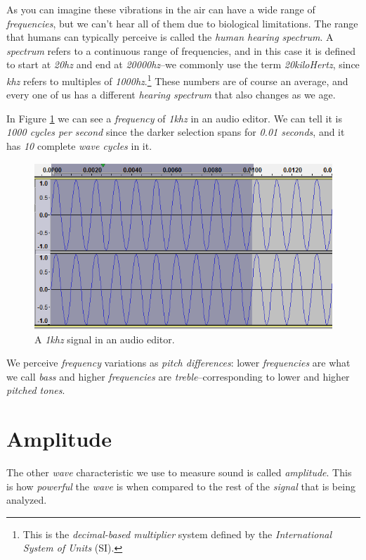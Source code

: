 \documentclass[10pt,a4paper]{report}
\newcommand{\ac}[1]{\textit{\acrshort{#1}}}
\newcommand{\hz}[1]{\textit{#1\acrshort{hz}}}
\newcommand{\khz}[1]{\textit{#1\acrshort{khz}}}
\begin{document}
As you can imagine these vibrations in the air can have a wide range of \textit{frequencies}, but we can't hear all of them due to biological limitations. The range that humans can typically perceive is called the \textit{human hearing spectrum}. A \textit{spectrum} refers to a continuous range of frequencies, and in this case it is defined to start at \hz{20} and end at \hz{20000}--we commonly use the term \textit{20kiloHertz}, since \ac{khz} refers to multiples of \hz{1000}.\footnote{This is the \textit{decimal-based multiplier} system defined by the \textit{International System of Units} (SI).} These numbers are of course an average, and every one of us has a different \textit{hearing spectrum} that also changes as we age.

In Figure \ref{fig:frequency} we can see a \textit{frequency} of \khz{1} in an audio editor. We can tell it is \textit{1000 cycles per second} since the darker selection spans for \textit{0.01 seconds}, and it has \textit{10} complete \textit{wave cycles} in it.

\begin{figure}[H]
	\centering
	\includegraphics[width=0.8\linewidth]{images/audio/frequency.png}
	\caption[Frequency]{A \khz{1} signal in an audio editor.}
	\label{fig:frequency}
\end{figure}

We perceive \textit{frequency} variations as \textit{pitch differences}: lower \textit{frequencies} are what we call \textit{bass} and higher \textit{frequencies} are \textit{treble}--corresponding to lower and higher \textit{pitched tones}.

\section{Amplitude}

The other \textit{wave} characteristic we use to measure sound is called \textit{amplitude}. This is how \textit{powerful} the \textit{wave} is when compared to the rest of the \textit{signal} that is being analyzed. 
\end{document}
